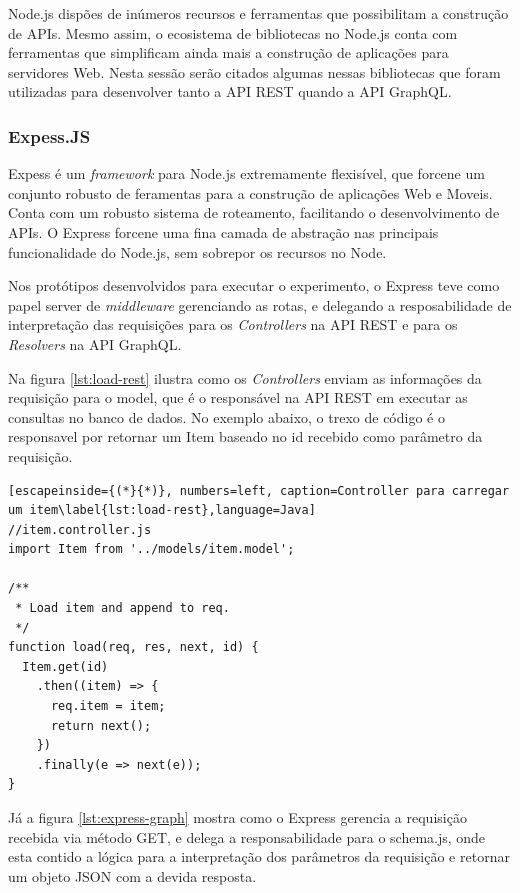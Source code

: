 Node.js dispões de inúmeros recursos e ferramentas que possibilitam a construção de APIs. Mesmo assim, o ecosistema de bibliotecas no Node.js conta com ferramentas que simplificam ainda mais a construção de aplicações para servidores Web. Nesta sessão serão citados algumas nessas bibliotecas que foram utilizadas para desenvolver tanto a API REST quando a API GraphQL. 

\subsubsection*{Expess.JS}

Expess é um \textit{framework} para Node.js extremamente flexisível, que forcene um conjunto robusto de feramentas para a construção de aplicações Web e Moveis. Conta com um robusto sistema de roteamento, facilitando o desenvolvimento de APIs. O Express forcene uma fina camada de abstração nas principais funcionalidade do Node.js, sem sobrepor os recursos no Node.

Nos protótipos desenvolvidos para executar o experimento, o Express teve como papel server de \textit{middleware} gerenciando as rotas, e delegando a resposabilidade de interpretação das requisições para os \textit{Controllers} na API REST e para os \textit{Resolvers} na API GraphQL.

Na figura \ref{lst:load-rest} ilustra como os \textit{Controllers} enviam as informações da requisição para o model, que é o responsável na API REST em executar as consultas no banco de dados. No exemplo abaixo, o trexo de código é o responsavel por retornar um Item baseado no id recebido como parâmetro da requisição.

\begin{lstlisting}[escapeinside={(*}{*)}, numbers=left, caption=Controller para carregar um item\label{lst:load-rest},language=Java]
//item.controller.js
import Item from '../models/item.model';

/**
 * Load item and append to req.
 */
function load(req, res, next, id) {
  Item.get(id)
    .then((item) => {
      req.item = item;
      return next();
    })
    .finally(e => next(e));
}

\end{lstlisting}

Já a figura \ref{lst:express-graph} mostra como o Express gerencia a requisição recebida via método GET, e delega a responsabilidade para o schema.js, onde esta contido a lógica para a interpretação dos parâmetros da requisição e retornar um objeto JSON com a devida resposta.

